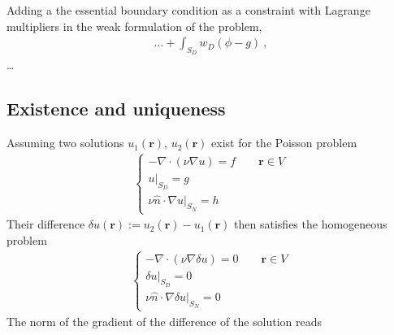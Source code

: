 \documentclass[letterpaper,10pt,english]{jupyterBook}
\begin{document}
\sphinxAtStartPar
{}

\sphinxAtStartPar
{} Adding a the essential boundary condition as a constraint with Lagrange multipliers in the weak formulation of the problem,
\begin{equation*}
\begin{split}\dots + \int_{S_D} w_D ( \phi - g ) \ ,\end{split}
\end{equation*}
\sphinxAtStartPar
…


\subsection{Existence and uniqueness}
\label{\detokenize{ch/pde/elliptic:existence-and-uniqueness}}\label{\detokenize{ch/pde/elliptic:pde-elliptic-poisson-weaki-uniqueness}}
\sphinxAtStartPar
Assuming two solutions \(u_1(\mathbf{r})\), \(u_2(\mathbf{r})\) exist for the Poisson problem
\begin{equation*}
\begin{split}\begin{cases}
  - \nabla \cdot ( \nu \nabla u ) = f  \qquad \mathbf{r} \in V \\
  u|_{S_D} = g \\
  \nu \hat{n} \cdot \nabla u|_{S_N} = h
\end{cases}\end{split}
\end{equation*}
\sphinxAtStartPar
Their difference \(\delta u (\mathbf{r}) := u_2(\mathbf{r}) - u_1(\mathbf{r})\) then satisfies the homogeneous problem
\begin{equation*}
\begin{split}\begin{cases}
  - \nabla \cdot ( \nu \nabla \delta u ) = 0  \qquad \mathbf{r} \in V \\
  \delta u|_{S_D} = 0 \\
  \nu \hat{n} \cdot \nabla \delta u|_{S_N} = 0
\end{cases}\end{split}
\end{equation*}
\sphinxAtStartPar
The norm of the gradient of the difference of the solution reads
\end{document}
